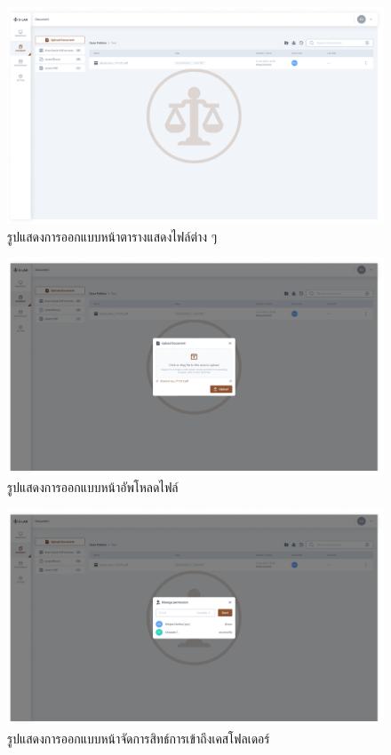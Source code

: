 \documentclass[12pt,oneside,openright,a4paper]{cpe-thai-project}
\begin{document}
\begin{figure}[!h]\centering
  \includegraphics[width=16cm]{./assets/userinterface/document-list.png}
  \caption{รูปแสดงการออกแบบหน้าตารางแสดงไฟล์ต่าง ๆ}\label{fig:document-list}
\end{figure}

\begin{figure}[!h]\centering
  \includegraphics[width=16cm]{./assets/userinterface/upload-document.png}
  \caption{รูปแสดงการออกแบบหน้าอัพโหลดไฟล์}\label{fig:upload-document}
\end{figure}
\clearpage

\begin{figure}[!h]\centering
  \includegraphics[width=16cm]{./assets/userinterface/folder-permission.png}
  \caption{รูปแสดงการออกแบบหน้าจัดการสิทธ์การเข้าถึงเคสโฟลเดอร์}\label{fig:folder-permission}
\end{figure}
\end{document}
